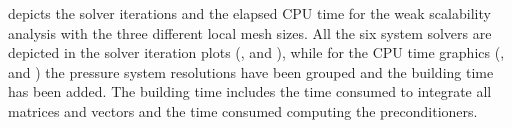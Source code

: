  depicts the solver iterations and the elapsed CPU time for the weak scalability analysis with the three different local mesh sizes. All the six system solvers are depicted in the solver iteration plots (,  and ), while for the CPU time graphics (,  and ) the pressure system resolutions have been grouped and the building time has been added. The building time includes the time consumed to integrate all matrices and vectors and the time consumed computing the preconditioners.
\begin{figure}[p]
  \centering
  \\
  \\

\end{figure}
